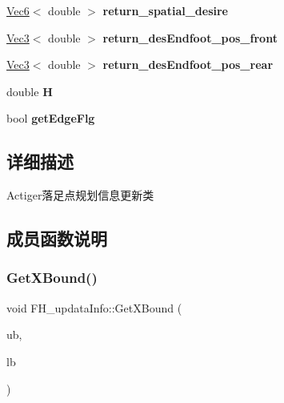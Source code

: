 \begin{DoxyCompactItemize}
\item 
\mbox{\label{classquadruped_1_1FH__updataInfo_ac845a4d5a050349209bc0da905eec60f}} 
\hyperlink{cppTypes_8h_a27bb8a600520708a5928332e4e52a92e}{Vec6}$<$ double $>$ {\bfseries return\+\_\+spatial\+\_\+desire}
\item 
\mbox{\label{classquadruped_1_1FH__updataInfo_abec95bccb97e123a3d9dae4854d5d63e}} 
\hyperlink{cppTypes_8h_a65c27bf97693676535dd0b30ea0ad399}{Vec3}$<$ double $>$ {\bfseries return\+\_\+des\+Endfoot\+\_\+pos\+\_\+front}
\item 
\mbox{\label{classquadruped_1_1FH__updataInfo_a0e66f8fffc6fd0471bd8a438e29d64c6}} 
\hyperlink{cppTypes_8h_a65c27bf97693676535dd0b30ea0ad399}{Vec3}$<$ double $>$ {\bfseries return\+\_\+des\+Endfoot\+\_\+pos\+\_\+rear}
\item 
\mbox{\label{classquadruped_1_1FH__updataInfo_a4fd0187b50a927dcc3a3b99e6c9fe311}} 
double {\bfseries H}
\item 
\mbox{\label{classquadruped_1_1FH__updataInfo_a312e51983c171fde47a0cc35f4bdbbc0}} 
bool {\bfseries get\+Edge\+Flg}
\end{DoxyCompactItemize}


\subsection{详细描述}
Actiger落足点规划信息更新类 

\subsection{成员函数说明}
\mbox{\label{classquadruped_1_1FH__updataInfo_a1ef2f860fc18a7176f6b9ffc694778ee}} 
\subsubsection{\texorpdfstring{Get\+X\+Bound()}{GetXBound()}}
{\footnotesize\ttfamily void F\+H\+\_\+updata\+Info\+::\+Get\+X\+Bound (\begin{DoxyParamCaption}\item[{double $\ast$}]{ub,  }\item[{double $\ast$}]{lb }\end{DoxyParamCaption})}

